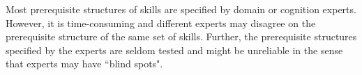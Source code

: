 \documentclass{edm_template}
\begin{document}
Most prerequisite structures of skills are specified by domain or cognition experts. However, it is time-consuming and different experts may disagree
on the prerequisite structure of the same set of skills. Further, the prerequisite structures specified by the experts are seldom tested and might be unreliable in
the sense that experts may have ``blind spots".





%
\end{document}
